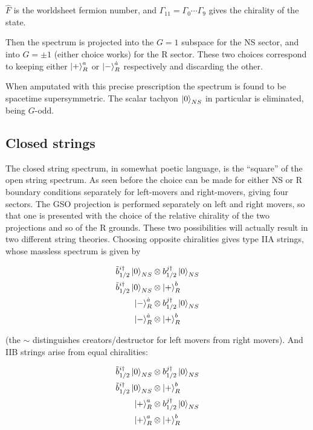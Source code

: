 $\hat F$ is the worldsheet fermion number, and $\Gamma_{11} = \Gamma_0 \cdots\Gamma_9$ gives the chirality of the state.

Then the spectrum is projected into the $G=1$ subspace for the NS sector, and into $G=\pm1$ (either choice works) for the R sector. These two choices correspond to keeping either $\ket{+}^a_R$ or $\ket{-}^{\dot a}_R$ respectively and discarding the other.

When amputated with this precise prescription the spectrum is found to be spacetime supersymmetric. The scalar tachyon $\ket{0}_{NS}$ in particular is eliminated, being $G$-odd.

\subsection{Closed strings}

The closed string spectrum, in somewhat poetic language, is the ``square'' of the open string spectrum. As seen before the choice can be made for either NS or R boundary conditions separately for left-movers and right-movers, giving four sectors. The GSO projection is performed separately on left and right movers, so that one is presented with the choice of the relative chirality of the two projections and so of the R grounds. These two possibilities will actually result in two different string theories. Choosing opposite chiralities gives type IIA strings, whose massless spectrum is given by

\begin{align}
	\tilde b_{1/2}^{i\dagger} \ket 0_{NS} &\otimes b_{1/2}^{j\dagger}\ket{0}_{NS} \label{NSNSground2}\\
	\tilde b_{1/2}^{i\dagger} \ket 0_{NS} &\otimes \ket{+}^b_{R}\\
	\ket{-}^{\dot a}_R &\otimes b_{1/2}^{j\dagger}\ket{0}_{NS}\\
	\ket{-}^{\dot a}_R &\otimes \ket{+}^b_R
	\label{}
\end{align}

(the $\sim$ distinguishes creators/destructor for left movers from right movers). And IIB strings arise from equal chiralities:


\begin{align}
	\tilde b_{1/2}^{i\dagger} \ket 0_{NS} &\otimes b_{1/2}^{j\dagger}\ket{0}_{NS} \label{NSNSground}\\
	\tilde b_{1/2}^{i\dagger} \ket 0_{NS} &\otimes \ket{+}^b_{R}\\
	\ket{+}^a_R &\otimes b_{1/2}^{j\dagger}\ket{0}_{NS}\\
	\ket{+}^a_R &\otimes \ket{+}^b_R
	\label{}
\end{align}

